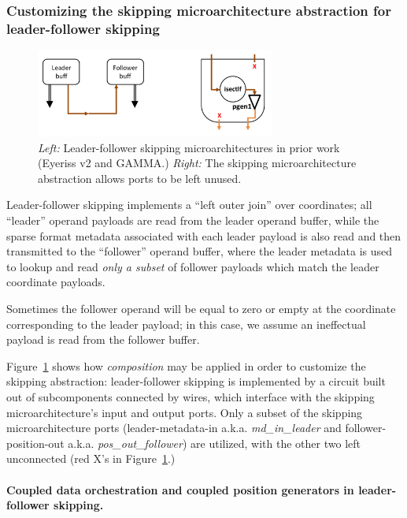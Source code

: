 \subsubsection{Customizing the skipping microarchitecture abstraction for leader-follower skipping}
\label{sec:skipping_lf}

\begin{figure}[ht]
    \centering
    \includegraphics[width=0.7\textwidth]{figures/prior_lf_skip.pdf}
    \caption{\textit{Left:} Leader-follower skipping microarchitectures in prior work (Eyeriss v2\cite{eyerissv2} and GAMMA\cite{gamma}.) \textit{Right:} The skipping microarchitecture abstraction allows ports to be left unused.}
    \label{fig:prior_lf_skip}
\end{figure}

Leader-follower skipping\cite{sparseloop} implements a ``left outer join'' over coordinates; all ``leader'' operand payloads are read from the leader operand buffer, while the sparse format metadata associated with each leader payload is also read and then transmitted to the ``follower'' operand buffer, where the leader metadata is used to lookup and read \textit{only a subset} of follower payloads which match the leader coordinate payloads. 

Sometimes the follower operand will be equal to zero or empty at the coordinate corresponding to the leader payload; in this case, we assume an ineffectual payload is read from the follower buffer.

Figure~\ref{fig:prior_lf_skip} shows how \textit{composition} may be applied in order to customize the skipping abstraction: leader-follower skipping is implemented by a circuit built out of subcomponents connected by wires, which interface with the skipping microarchitecture's input and output ports. Only a subset of the skipping microarchitecture ports (leader-metadata-in a.k.a. \textit{md\_in\_leader} and follower-position-out a.k.a. \textit{pos\_out\_follower}) are utilized, with the other two left unconnected (red X's in Figure~\ref{fig:prior_lf_skip}.)

\paragraph{Coupled data orchestration and coupled position generators in leader-follower skipping.}

